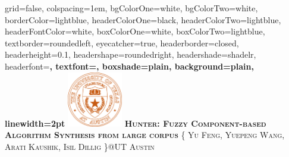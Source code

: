 \documentclass[landscape,final,a0paper,fontscale=0.285]{baposter}
\begin{document}
\begin{poster}%
  {
  grid=false,
  colspacing=1em,
  bgColorOne=white,
  bgColorTwo=white,
  borderColor=lightblue,
  headerColorOne=black,
  headerColorTwo=lightblue,
  headerFontColor=white,
  boxColorOne=white,
  boxColorTwo=lightblue,
  textborder=roundedleft,
  eyecatcher=true,
  headerborder=closed,
  headerheight=0.1\textheight,
  headershape=roundedright,
  headershade=shadelr,
  headerfont=\Large\bf\textsc, %
  textfont={\setlength{\parindent}{1.5em}},
  boxshade=plain,
  background=plain,
  linewidth=2pt
  }
  {\includegraphics[height=6.5em]{images/ut.png}} 
  {\bf\textsc{Hunter: Fuzzy Component-based Algorithm Synthesis from large corpus}\vspace{0.1em}}
  {\textsc{\{ Yu Feng, Yuepeng Wang, Arati Kaushik, Isil Dillig \}@UT Austin}}

    \newcommand{\colouredcircle}{%
      \tikz{\useasboundingbox (-0.2em,-0.32em) rectangle(0.2em,0.32em); \draw[draw=black,fill=lightblue,line width=0.03em] (0,0) circle(0.18em);}}


\end{poster}
\end{document}
